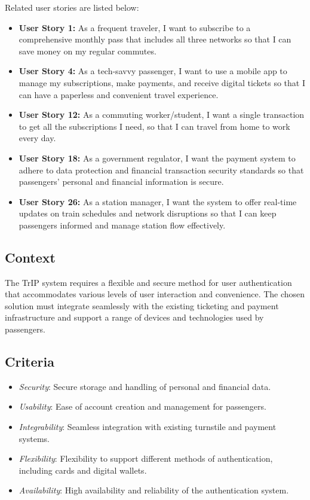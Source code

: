 Related user stories are listed below:
\begin{itemize}
    \item \textbf{User Story 1:} As a frequent traveler, I want to subscribe to a comprehensive monthly pass that includes all three networks so that I can save money on my regular commutes.
    \item \textbf{User Story 4:} As a tech-savvy passenger, I want to use a mobile app to manage my subscriptions, make payments, and receive digital tickets so that I can have a paperless and convenient travel experience.
    \item \textbf{User Story 12:} As a commuting worker/student, I want a single transaction to get all the subscriptions I need, so that I can travel from home to work every day. 
    \item \textbf{User Story 18:} As a government regulator, I want the payment system to adhere to data protection and financial transaction security standards so that passengers' personal and financial information is secure.
    \item \textbf{User Story 26:} As a station manager, I want the system to offer real-time updates on train schedules and network disruptions so that I can keep passengers informed and manage station flow effectively.
\end{itemize}

\subsection*{Context}
The TrIP system requires a flexible and secure method for user authentication that accommodates various levels of user interaction and convenience. The chosen solution must integrate seamlessly with the existing ticketing and payment infrastructure and support a range of devices and technologies used by passengers.

\subsection*{Criteria}
\begin{itemize}
    \item \textit{Security}: Secure storage and handling of personal and financial data.
    \item \textit{Usability}: Ease of account creation and management for passengers.
    \item \textit{Integrability}: Seamless integration with existing turnstile and payment systems.
    \item \textit{Flexibility}: Flexibility to support different methods of authentication, including cards and digital wallets.
    \item \textit{Availability}: High availability and reliability of the authentication system.
\end{itemize}

